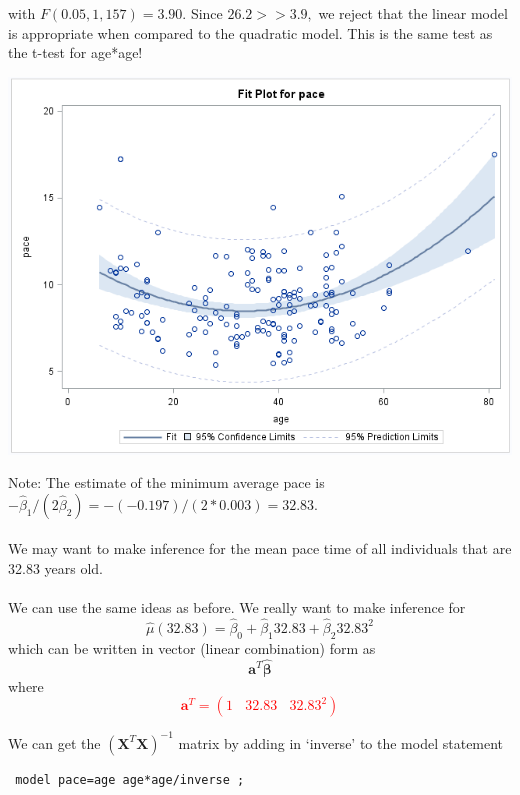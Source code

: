 with $F(0.05,1,157)=3.90$.  Since $26.2 > > 3.9,$ we reject that the linear model is appropriate when compared to the quadratic model.  This is the same test as the t-test for age*age!

\begin{flushleft}
\includegraphics[scale=0.7]{resrunquadraticplot}
\end{flushleft}

\newpage


Note: The estimate of the minimum average pace is $-\hat{\beta}_1/(2\hat{\beta}_2)=-(-0.197)/(2*0.003)=32.83$.  \\~\\

We may want to make inference for the mean pace time of all individuals that are 32.83 years old.\\~\\

We can use the same ideas as before.  We really want to make inference for 
$$\hat{\mu}(32.83)=\hat{\beta}_0+\hat{\beta}_{1}32.83+\hat{\beta}_{2}32.83^2$$
which can be written in vector (linear combination) form as
$$\textbf{a}^{T}\boldsymbol{\hat{\beta}}$$ 
where 
\textcolor{red}{$$\textbf{a}^{T}=(1~~~~32.83~~~~32.83^2)$$}

We can get the $\left(\textbf{X}^{T}\textbf{X}\right)^{-1}$ matrix by adding in `inverse' to the model statement
\begin{small}
\begin{verbatim}
 model pace=age age*age/inverse ; 
\end{verbatim}
\end{small}

